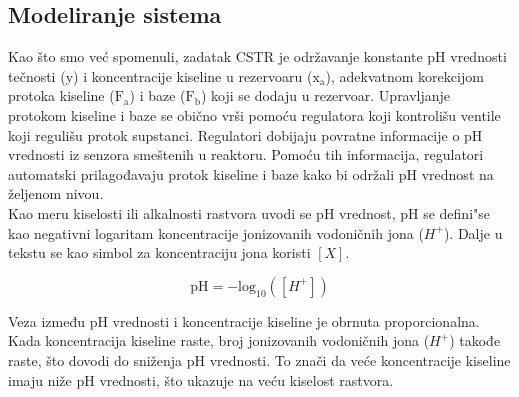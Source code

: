 \documentclass[a4paper,11pt]{article}
\theoremstyle{definition} \newtheorem{deff}{Definicija}[section]
\theoremstyle{definition} \newtheorem{prim}[deff]{Primer}
\theoremstyle{plain} \newtheorem{teor}[deff]{Teorema}
\begin{document}
	
	
	
	
	\newpage
	
	\subsection{Modeliranje sistema} 
	
	Kao što smo već spomenuli, zadatak CSTR je održavanje konstante pH vrednosti tečnosti ($\mathrm{y}$) i koncentracije kiseline u rezervoaru ($\mathrm{x_a}$), adekvatnom korekcijom protoka kiseline ($\mathrm{F_a}$) i baze ($\mathrm{F_b}$) koji se dodaju u rezervoar. Upravljanje protokom kiseline i baze se obično vrši pomoću regulatora koji kontrolišu ventile koji regulišu protok supstanci. Regulatori dobijaju povratne informacije o pH vrednosti iz senzora smeštenih u reaktoru. Pomoću tih informacija, regulatori automatski prilagođavaju protok kiseline i baze kako bi održali pH vrednost na željenom nivou.\\
	
	Kao meru kiselosti ili alkalnosti rastvora uvodi se pH vrednost, pH se defini"se kao negativni logaritam koncentracije jonizovanih vodoničnih jona ($H^+$). Dalje u tekstu se kao simbol za koncentraciju jona koristi $[X]$.
	
	\begin{equation}
		\text{pH} = -\text{log}_{10}([H^+])
	\end{equation}
	
	\noindent Veza između pH vrednosti i koncentracije kiseline je obrnuta proporcionalna.  Kada koncentracija kiseline raste, broj jonizovanih vodoničnih jona ($H^+$) takođe raste, što dovodi do sniženja pH vrednosti. To znači da veće koncentracije kiseline imaju niže pH vrednosti, što ukazuje na veću kiselost rastvora.\\
	
\end{document}
